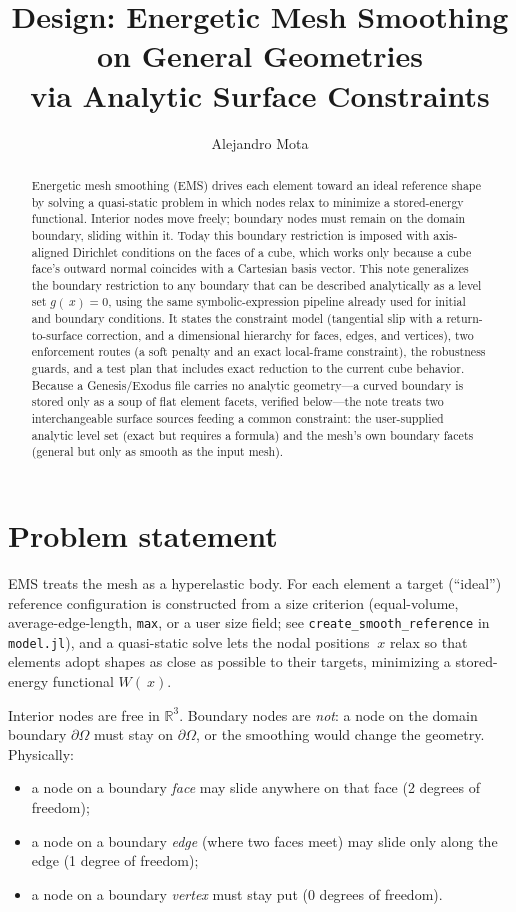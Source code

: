 \documentclass[11pt]{article}
\title{Design: Energetic Mesh Smoothing on General Geometries\\
via Analytic Surface Constraints}
\author{Alejandro Mota}
\newcommand{\Real}{\mathbb{R}}
\newcommand{\code}[1]{\texttt{#1}}
\begin{document}
\maketitle

\begin{abstract}
Energetic mesh smoothing (EMS) drives each element toward an ideal reference
shape by solving a quasi-static problem in which nodes relax to minimize a
stored-energy functional. Interior nodes move freely; boundary nodes must
remain on the domain boundary, sliding within it. Today this boundary
restriction is imposed with axis-aligned Dirichlet conditions on the faces of a
cube, which works only because a cube face's outward normal coincides with a
Cartesian basis vector. This note generalizes the boundary restriction to any
boundary that can be described analytically as a level set $g(~x)=0$, using the
same symbolic-expression pipeline already used for initial and boundary
conditions. It states the constraint model (tangential slip with a
return-to-surface correction, and a dimensional hierarchy for faces, edges, and
vertices), two enforcement routes (a soft penalty and an exact local-frame
constraint), the robustness guards, and a test plan that includes exact
reduction to the current cube behavior. Because a Genesis/Exodus file carries no
analytic geometry---a curved boundary is stored only as a soup of flat element
facets, verified below---the note treats two interchangeable surface sources
feeding a common constraint: the user-supplied analytic level set (exact but
requires a formula) and the mesh's own boundary facets (general but only as
smooth as the input mesh).
\end{abstract}

\section{Problem statement}

EMS treats the mesh as a hyperelastic body. For each element a target
(``ideal'') reference configuration is constructed from a size criterion
(equal-volume, average-edge-length, \code{max}, or a user size field; see
\code{create\_smooth\_reference} in \code{model.jl}), and a quasi-static solve
lets the nodal positions $~x$ relax so that elements adopt shapes as close as
possible to their targets, minimizing a stored-energy functional $W(~x)$.

Interior nodes are free in $\Real^3$. Boundary nodes are \emph{not}: a node on
the domain boundary $\partial\Omega$ must stay on $\partial\Omega$, or the
smoothing would change the geometry. Physically:
\begin{itemize}[nosep]
  \item a node on a boundary \emph{face} may slide anywhere on that face
        (2 degrees of freedom);
  \item a node on a boundary \emph{edge} (where two faces meet) may slide only
        along the edge (1 degree of freedom);
  \item a node on a boundary \emph{vertex} must stay put (0 degrees of freedom).
\end{itemize}
\end{document}
